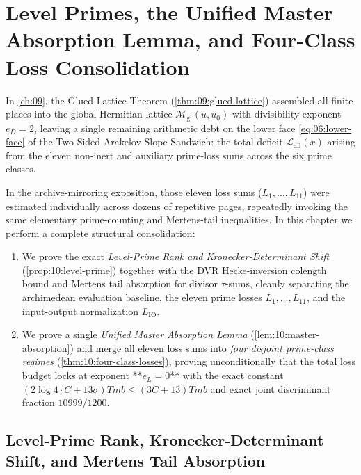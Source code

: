 \chapter{Level Primes, the Unified Master Absorption Lemma, and Four-Class Loss Consolidation}
\label{ch:10}

In \cref{ch:09}, the Glued Lattice Theorem (\cref{thm:09:glued-lattice}) assembled all finite places into the global Hermitian lattice $\mathcal{M}_{\mathrm{gl}}(u, u_0)$ with divisibility exponent $e_D = 2$, leaving a single remaining arithmetic debt on the lower face \eqref{eq:06:lower-face} of the Two-Sided Arakelov Slope Sandwich: the total deficit $\mathcal{L}_{\mathrm{all}}(x)$ arising from the eleven non-inert and auxiliary prime-loss sums across the six prime classes.

In the archive-mirroring exposition, those eleven loss sums ($L_1, \dots, L_{11}$) were estimated individually across dozens of repetitive pages, repeatedly invoking the same elementary prime-counting and Mertens-tail inequalities. In this chapter we perform a complete structural consolidation:
\begin{enumerate}[label=(\roman*)]
\item We prove the exact \emph{Level-Prime Rank and Kronecker-Determinant Shift} (\cref{prop:10:level-prime}) together with the DVR Hecke-inversion colength bound and Mertens tail absorption for divisor $\tau$-sums, cleanly separating the archimedean evaluation baseline, the eleven prime losses $L_1, \dots, L_{11}$, and the input-output normalization $L_{\mathrm{IO}}$.
\item We prove a single \emph{Unified Master Absorption Lemma} (\cref{lem:10:master-absorption}) and merge all eleven loss sums into \emph{four disjoint prime-class regimes} (\cref{thm:10:four-class-losses}), proving unconditionally that the total loss budget locks at exponent **$e_L = 0$** with the exact constant $(2\log 4 \cdot C + 13\sigma) T m b \le (3C + 13) T m b$ and exact joint discriminant fraction $10999/1200$.
\end{enumerate}

\section{Level-Prime Rank, Kronecker-Determinant Shift, and Mertens Tail Absorption}
\label{sec:10:level-prime}

